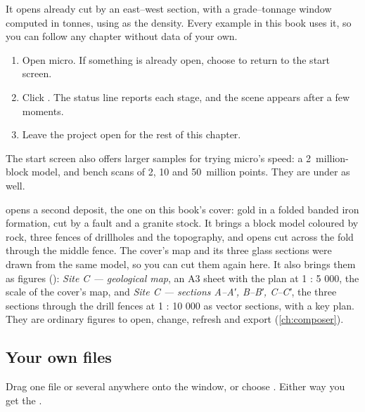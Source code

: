 It opens already cut by an east–west section, with a grade–tonnage window computed in tonnes, using  as the density. Every example in this book uses it, so you can follow any chapter without data of your own.

\begin{tryit}
\begin{enumerate}
\item Open micro. If something is already open, choose  to return to the start screen.
\item Click . The status line reports each stage, and the scene appears after a few moments.
\item Leave the project open for the rest of this chapter.
\end{enumerate}
\end{tryit}

The start screen also offers larger samples for trying micro's speed: a 2~million-block model, and bench scans of 2, 10 and 50~million points. They are under  as well.

 opens a second deposit, the one on this book's cover: gold in a folded banded iron formation, cut by a fault and a granite stock. It brings a block model coloured by rock, three fences of drillholes and the topography, and opens cut across the fold through the middle fence. The cover's map and its three glass sections were drawn from the same model, so you can cut them again here.
It also brings them as figures (): \emph{Site C — geological map}, an A3 sheet with the
plan at 1 : 5 000, the scale of the cover's map, and \emph{Site C — sections A–A′, B–B′, C–C′}, the three
sections through the drill fences at 1 : 10 000 as vector sections, with a key plan. They are ordinary
figures to open, change, refresh and export (\cref{ch:composer}).

\subsection{Your own files}
Drag one file or several anywhere onto the window, or choose . Either way you get the .



